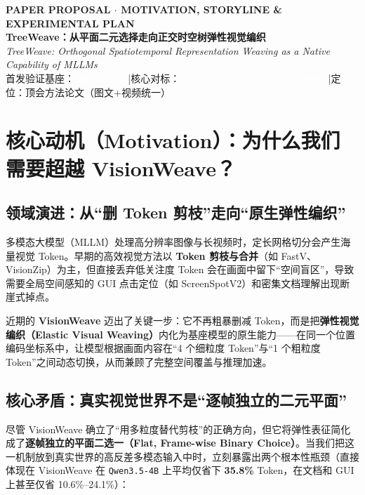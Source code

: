 \documentclass[11pt,a4paper]{ctexart}
\begin{document}
\begin{tcolorbox}[enhanced, colback=NavyBlue, colframe=NavyBlue, arc=4pt, left=15pt, right=15pt, top=14pt, bottom=14pt]
  {\footnotesize\color{BorderBlue}\textbf{PAPER PROPOSAL $\cdot$ MOTIVATION, STORYLINE \& EXPERIMENTAL PLAN}}\\[6pt]
  {\LARGE\bfseries\color{white} TreeWeave：从平面二元选择走向正交时空树弹性视觉编织}\\[6pt]
  {\normalsize\color{SkySoft}\textit{TreeWeave: Orthogonal Spatiotemporal Representation Weaving as a Native Capability of MLLMs}}\\[8pt]
  {\footnotesize\color{BorderBlue} 首发验证基座：\textcolor{white}{\texttt{Qwen3.5-4B}} \quad|\quad 核心对标：\textcolor{white}{VisionWeave (\texttt{arXiv:2610.07987})} \quad|\quad 定位：顶会方法论文（图文+视频统一）}
\end{tcolorbox}

\vspace{4pt}

\section{核心动机（Motivation）：为什么我们需要超越 VisionWeave？}

\subsection{领域演进：从``删 Token 剪枝''走向``原生弹性编织''}
多模态大模型（MLLM）处理高分辨率图像与长视频时，定长网格切分会产生海量视觉 Token。早期的高效视觉方法以 \textbf{Token 剪枝与合并}（如 FastV、VisionZip）为主，但直接丢弃低关注度 Token 会在画面中留下``空间盲区''，导致需要全局空间感知的 GUI 点击定位（如 ScreenSpotV2）和密集文档理解出现断崖式掉点。

近期的 \textbf{VisionWeave} 迈出了关键一步：它不再粗暴删减 Token，而是把\textbf{弹性视觉编织（Elastic Visual Weaving）}内化为基座模型的原生能力——在同一个位置编码坐标系中，让模型根据画面内容在``4 个细粒度 Token''与``1 个粗粒度 Token''之间动态切换，从而兼顾了完整空间覆盖与推理加速。

\subsection{核心矛盾：真实视觉世界不是``逐帧独立的二元平面''}
尽管 VisionWeave 确立了``用多粒度替代剪枝''的正确方向，但它将弹性表征简化成了\textbf{逐帧独立的平面二选一（Flat, Frame-wise Binary Choice）}。当我们把这一机制放到真实世界的高反差多模态输入中时，立刻暴露出两个根本性瓶颈（直接体现在 VisionWeave 在 \texttt{Qwen3.5-4B} 上平均仅省下 \textbf{35.8\%} Token，在文档和 GUI 上甚至仅省 10.6\%--24.1\%）：
\end{document}

